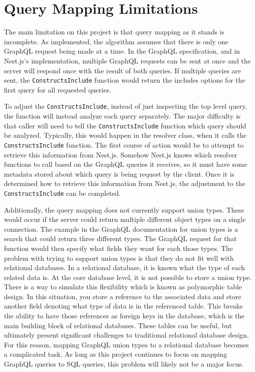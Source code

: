 \section{Query Mapping Limitations}
The main limitation on this project is that query mapping as it stands is incomplete. As implemented, the algorithm assumes that there is only one GraphQL request being made at a time.  In the GraphQL specification, and in Nest.js's implementation, multiple GraphQL requests can be sent at once and the server will respond once with the result of both queries.  If multiple queries are sent, the \verb!ConstructsInclude! function would return the includes options for the first query for all requested queries.

To adjust the \verb!ConstructsInclude!, instead of just inspecting the top level query, the function will instead analyze each query separately.  The major difficulty is that caller will need to tell the \verb!ConstructsInclude! function which query should be analyzed. Typically, this would happen in the resolver class, when it calls the \verb!ConstructsInclude! function. The first course of action would be to attempt to retrieve this information from Nest.js.  Somehow Nest.js knows which resolver functions to call based on the GraphQL queries it receives, so it must have some metadata stored about which query is being request by the client.  Once it is determined how to retrieve this information from Nest.js, the adjustment to the \verb!ConstructsInclude! can be completed.

Additionally, the query mapping does not currently support union types.  These would occur if the server could return multiple different object types on a single connection.  The example in the GraphQL documentation for union types is a search that could return three different types.  The GraphQL request for that function would then specify what fields they want for each those types.  The problem with trying to support union types is that they do not fit well with relational databases.  In a relational database, it is known what the type of each related data is.  At the core database level, it is not possible to store a union type.  There is a way to simulate this flexibility which is known as polymorphic table design.  In this situation, you store a reference to the associated data and store another field denoting what type of data is in the referenced table.  This breaks the ability to have those references as foreign keys in the database, which is the main building block of relational databases. These tables can be useful, but ultimately present significant challenges to traditional relational database design.  For this reason, mapping GraphQL union types to a relational database becomes a complicated task.  As long as this project continues to focus on mapping GraphQL queries to SQL queries, this problem will likely not be a major focus.

